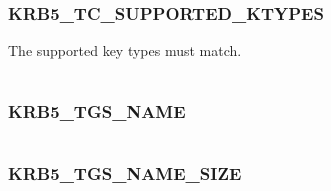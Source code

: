 \documentclass[letterpaper,10pt,english]{sphinxmanual}
\begin{document}
\subsubsection{KRB5\_TC\_SUPPORTED\_KTYPES}
\label{appdev/refs/macros/KRB5_TC_SUPPORTED_KTYPES:krb5-tc-supported-ktypes-data}\label{appdev/refs/macros/KRB5_TC_SUPPORTED_KTYPES::doc}\label{appdev/refs/macros/KRB5_TC_SUPPORTED_KTYPES:krb5-tc-supported-ktypes}

\begin{fulllineitems}
\label{appdev/refs/macros/KRB5_TC_SUPPORTED_KTYPES:KRB5_TC_SUPPORTED_KTYPES}
\end{fulllineitems}


The supported key types must match.

\begin{tabulary}{\linewidth}{|L|L|}
\hline

 & 
\\
\hline\end{tabulary}



\subsubsection{KRB5\_TGS\_NAME}
\label{appdev/refs/macros/KRB5_TGS_NAME:krb5-tgs-name-data}\label{appdev/refs/macros/KRB5_TGS_NAME::doc}\label{appdev/refs/macros/KRB5_TGS_NAME:krb5-tgs-name}

\begin{fulllineitems}
\label{appdev/refs/macros/KRB5_TGS_NAME:KRB5_TGS_NAME}
\end{fulllineitems}


\begin{tabulary}{\linewidth}{|L|L|}
\hline

 & 
\\
\hline\end{tabulary}



\subsubsection{KRB5\_TGS\_NAME\_SIZE}
\label{appdev/refs/macros/KRB5_TGS_NAME_SIZE:krb5-tgs-name-size}\label{appdev/refs/macros/KRB5_TGS_NAME_SIZE:krb5-tgs-name-size-data}\label{appdev/refs/macros/KRB5_TGS_NAME_SIZE::doc}
\end{document}
